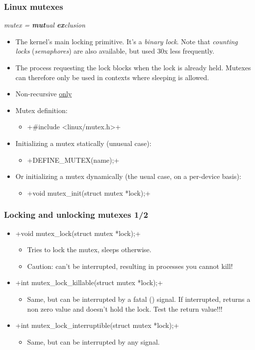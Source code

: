\begin{frame}[fragile]
  \frametitle{Linux mutexes}
  {\em mutex = {\bf mut}ual {\bf ex}clusion}
  \begin{itemize}
  \item The kernel's main locking primitive. It's a {\em binary lock}.
    Note that {\em counting locks} ({\em semaphores}) are also available,
    but used 30x less frequently.
  \item The process requesting the lock blocks when the lock is
    already held.  Mutexes can therefore only be used in contexts
    where sleeping is allowed.
  \item Non-recursive \underline{only}
  \item Mutex definition:
    \begin{itemize}
    \item {}+#include <linux/mutex.h>+
    \end{itemize}
  \item Initializing a mutex statically (unusual case):
    \begin{itemize}
    \item {}+DEFINE_MUTEX(name);+
    \end{itemize}
  \item Or initializing a mutex dynamically (the usual case, on a per-device basis):
    \begin{itemize}
    \item {}+void mutex_init(struct mutex *lock);+
    \end{itemize}
  \end{itemize}
\end{frame}

\begin{frame}[fragile]
  \frametitle{Locking and unlocking mutexes 1/2}
  \begin{itemize}
  \item {}+void mutex_lock(struct mutex *lock);+
    \begin{itemize}
    \item Tries to lock the mutex, sleeps otherwise.
    \item Caution: can't be interrupted, resulting in processes you
      cannot kill!
    \end{itemize}
  \item {}+int mutex_lock_killable(struct mutex *lock);+
    \begin{itemize}
    \item Same, but can be interrupted by a fatal () signal. If
      interrupted, returns a non zero value and doesn't hold the
      lock. Test the return value!!!
    \end{itemize}
  \item {}+int mutex_lock_interruptible(struct mutex *lock);+
    \begin{itemize}
    \item Same, but can be interrupted by any signal.
    \end{itemize}
  \end{itemize}
\end{frame}

